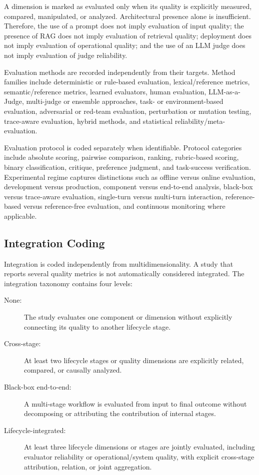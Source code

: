 A dimension is marked as evaluated only when its quality is explicitly measured, compared, manipulated, or analyzed. Architectural presence alone is insufficient. Therefore, the use of a prompt does not imply evaluation of input quality; the presence of RAG does not imply evaluation of retrieval quality; deployment does not imply evaluation of operational quality; and the use of an LLM judge does not imply evaluation of judge reliability.

Evaluation methods are recorded independently from their targets. Method families include deterministic or rule-based evaluation, lexical/reference metrics, semantic/reference metrics, learned evaluators, human evaluation, LLM-as-a-Judge, multi-judge or ensemble approaches, task- or environment-based evaluation, adversarial or red-team evaluation, perturbation or mutation testing, trace-aware evaluation, hybrid methods, and statistical reliability/meta-evaluation.

Evaluation protocol is coded separately when identifiable. Protocol categories include absolute scoring, pairwise comparison, ranking, rubric-based scoring, binary classification, critique, preference judgment, and task-success verification. Experimental regime captures distinctions such as offline versus online evaluation, development versus production, component versus end-to-end analysis, black-box versus trace-aware evaluation, single-turn versus multi-turn interaction, reference-based versus reference-free evaluation, and continuous monitoring where applicable.

\subsection{Integration Coding}

Integration is coded independently from multidimensionality. A study that reports several quality metrics is not automatically considered integrated. The integration taxonomy contains four levels:

\begin{description}
\item[None:] The study evaluates one component or dimension without explicitly connecting its quality to another lifecycle stage.
\item[Cross-stage:] At least two lifecycle stages or quality dimensions are explicitly related, compared, or causally analyzed.
\item[Black-box end-to-end:] A multi-stage workflow is evaluated from input to final outcome without decomposing or attributing the contribution of internal stages.
\item[Lifecycle-integrated:] At least three lifecycle dimensions or stages are jointly evaluated, including evaluator reliability or operational/system quality, with explicit cross-stage attribution, relation, or joint aggregation.
\end{description}

